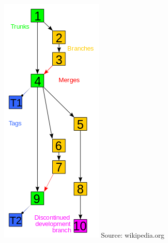 \documentclass{beamer}
\begin{document}
\begin{frame}
\begin{columns}
\begin{column}{0.75\linewidth}
	\end{column}
		\begin{column}{0.25\linewidth}
		\begin{figure}
			\includegraphics[width=\linewidth]{images/Revision_controlled_project_visualization.png}
			Source: wikipedia.org
		\end{figure}
	\end{column}
\end{columns}

\end{frame}
\end{document}
